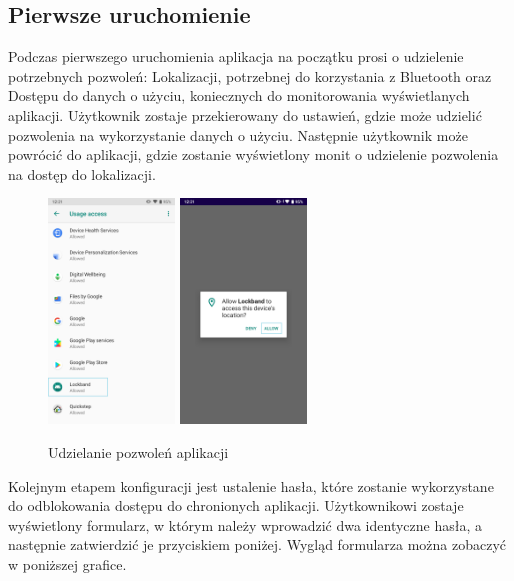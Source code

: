 \subsection{Pierwsze uruchomienie}
Podczas pierwszego uruchomienia aplikacja na początku prosi o udzielenie potrzebnych pozwoleń: Lokalizacji, potrzebnej do korzystania z Bluetooth oraz Dostępu do danych o użyciu, koniecznych do monitorowania wyświetlanych aplikacji. Użytkownik zostaje przekierowany do ustawień, gdzie może udzielić pozwolenia na wykorzystanie danych o użyciu. Następnie użytkownik może powrócić do aplikacji, gdzie zostanie wyświetlony monit o udzielenie pozwolenia na dostęp do lokalizacji. 
\begin{figure}[H]
    \begin{center}
        \includegraphics[width=0.3\textwidth]{app_screenshots/usage_stats_permission.png}
        \includegraphics[width=0.3\textwidth]{app_screenshots/location_permission.png}
    \end{center}
    \caption{{\color{dgray}Udzielanie pozwoleń aplikacji}} \label{usageStats}
\end{figure}
Kolejnym etapem konfiguracji jest ustalenie hasła, które zostanie wykorzystane do odblokowania dostępu do chronionych aplikacji. Użytkownikowi zostaje wyświetlony formularz, w którym należy wprowadzić dwa identyczne hasła, a następnie zatwierdzić je przyciskiem poniżej. Wygląd formularza można zobaczyć w poniższej grafice.
